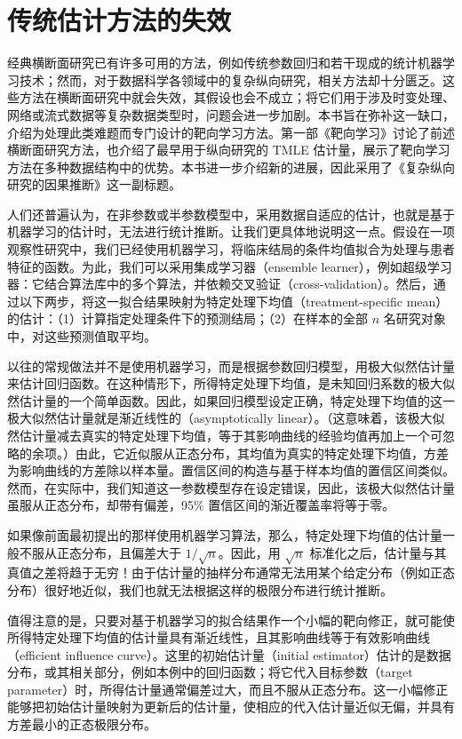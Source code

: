\section{传统估计方法的失效}
\label{sec:ch01-traditional-fail}

经典横断面研究已有许多可用的方法，例如传统参数回归和若干现成的统计机器学习技术；然而，对于数据科学各领域中的复杂纵向研究，相关方法却十分匮乏。这些方法在横断面研究中就会失效，其假设也会不成立；将它们用于涉及时变处理、网络或流式数据等复杂数据类型时，问题会进一步加剧。本书旨在弥补这一缺口，介绍为处理此类难题而专门设计的靶向学习方法。第一部《靶向学习》讨论了前述横断面研究方法，也介绍了最早用于纵向研究的 TMLE 估计量，展示了靶向学习方法在多种数据结构中的优势。本书进一步介绍新的进展，因此采用了《复杂纵向研究的因果推断》这一副标题。

人们还普遍认为，在非参数或半参数模型中，采用数据自适应的估计，也就是基于机器学习的估计时，无法进行统计推断。让我们更具体地说明这一点。假设在一项观察性研究中，我们已经使用机器学习，将临床结局的条件均值拟合为处理与患者特征的函数。为此，我们可以采用集成学习器（ensemble learner），例如超级学习器：它结合算法库中的多个算法，并依赖交叉验证（cross-validation）。然后，通过以下两步，将这一拟合结果映射为特定处理下均值（treatment-specific mean）的估计：（1）计算指定处理条件下的预测结局；（2）在样本的全部 $n$ 名研究对象中，对这些预测值取平均。

以往的常规做法并不是使用机器学习，而是根据参数回归模型，用极大似然估计量来估计回归函数。在这种情形下，所得特定处理下均值，是未知回归系数的极大似然估计量的一个简单函数。因此，如果回归模型设定正确，特定处理下均值的这一极大似然估计量就是渐近线性的（asymptotically linear）。（这意味着，该极大似然估计量减去真实的特定处理下均值，等于其影响曲线的经验均值再加上一个可忽略的余项。）由此，它近似服从正态分布，其均值为真实的特定处理下均值，方差为影响曲线的方差除以样本量。置信区间的构造与基于样本均值的置信区间类似。然而，在实际中，我们知道这一参数模型存在设定错误，因此，该极大似然估计量虽服从正态分布，却带有偏差，95\% 置信区间的渐近覆盖率将等于零。

如果像前面最初提出的那样使用机器学习算法，那么，特定处理下均值的估计量一般不服从正态分布，且偏差大于 $1/\sqrt{n}$。因此，用 $\sqrt{n}$ 标准化之后，估计量与其真值之差将趋于无穷！由于估计量的抽样分布通常无法用某个给定分布（例如正态分布）很好地近似，我们也就无法根据这样的极限分布进行统计推断。

值得注意的是，只要对基于机器学习的拟合结果作一个小幅的靶向修正，就可能使所得特定处理下均值的估计量具有渐近线性，且其影响曲线等于有效影响曲线（efficient influence curve）。这里的初始估计量（initial estimator）估计的是数据分布，或其相关部分，例如本例中的回归函数；将它代入目标参数（target parameter）时，所得估计量通常偏差过大，而且不服从正态分布。这一小幅修正能够把初始估计量映射为更新后的估计量，使相应的代入估计量近似无偏，并具有方差最小的正态极限分布。
